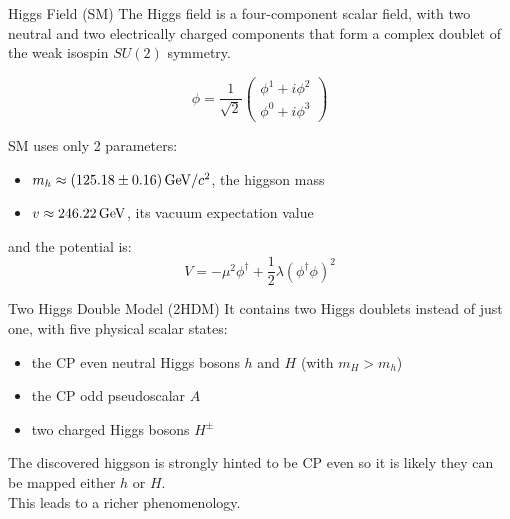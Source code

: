 \documentclass[10pt]{beamer} %
\begin{document}
\begin{frame}{Higgs Field (SM)}
The Higgs field is a four-component scalar field, with two neutral and two electrically charged components that form a complex doublet of the weak isospin $SU(2)$ symmetry. 

\begin{equation}
\phi ={\frac {1}{\sqrt {2}}}\left({\begin{array}{c}\phi ^{1}+i\phi ^{2}\\\phi ^{0}+i\phi ^{3}\end{array}}\right)
\end{equation}



SM uses only 2 parameters:
\begin{itemize}
    \item $m_h \approx (125.18 \pm 0.16)\,{\rm {GeV}}/c^2$, the higgson mass
    \item $v\approx 246.22\,{\rm {GeV}}$, its vacuum expectation value 
\end{itemize}

and the potential is:
\begin{equation}
    V = − \mu^2 \phi^\dagger + \frac{1}{2} \lambda (\phi^\dagger \phi )^2 
\end{equation}

\end{frame}

\begin{frame}{Two Higgs Double Model (2HDM)}
It contains two Higgs doublets instead of just one, with five physical scalar states:
\begin{itemize}
    \item the CP even neutral Higgs bosons $h$ and $H$ (with $m_H > m_h$)
    \item  the CP odd pseudoscalar $A$
    \item  two charged Higgs bosons $H^{\pm }$
\end{itemize}
The discovered higgson is strongly hinted to be CP even so it is likely they can be mapped either $h$ or $H$. \\

This leads to a richer phenomenology.\\

\end{frame}
\end{document}
